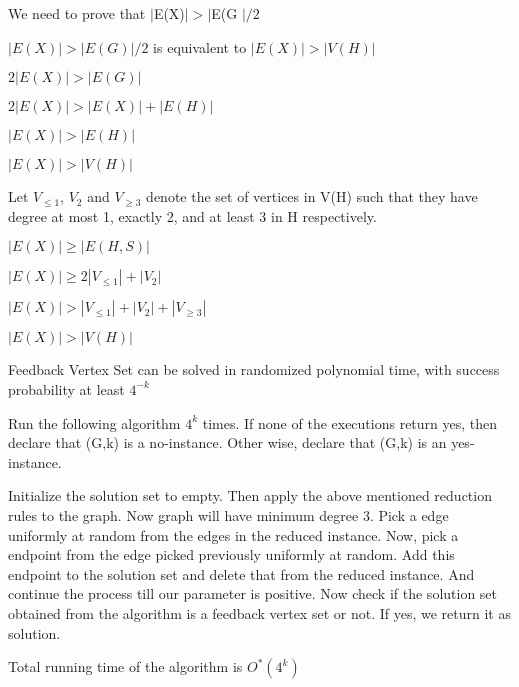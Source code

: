 \hspace*{2cm} We need to prove that $|$E(X)$| > |$E(G $|/2$

\hspace*{1.6cm} $|E(X)| >  |E(G)|/2$ is equivalent to $|E(X)| > |V(H)|$ 

\hspace*{2.6cm} $2|E(X)| > |E(G)| $ 

\hspace*{2.6cm} $2|E(X)| > |E(X)|+|E(H)| $ 

\hspace*{2.6cm} $|E(X)| > |E(H)| $ 

\hspace*{2.6cm} $|E(X)| > |V(H)|$ 

Let $V_{\leq 1}$, $V_2$ and $V_{\geq 3}$ denote the set of vertices in V(H) such that they
have degree at most 1, exactly 2, and at least 3 in H respectively. 

\hspace*{2cm} $|E(X)| \geq |E(H,S)|$ 

\hspace*{2cm} $|E(X)| \geq 2|V_{\leq 1}| + |V_2|$ 

\hspace*{2cm} $|E(X)| > |V_{\leq 1}| + |V_2| + |V_{\geq 3}|$ 

\hspace*{2cm} $|E(X)| > |V(H)|$ 

Feedback Vertex Set can be solved in randomized polynomial
time, with success probability at least $4^{-k}$

\vspace{0.3cm}
Run the following algorithm $4^k$ times. If none of the
executions return yes, then declare that (G,k) is a no-instance. Other wise, declare that
(G,k) is an yes-instance.

\hspace*{1.5cm} Initialize the solution set to empty. Then apply the above mentioned reduction rules to the graph.
Now graph will have minimum degree 3. Pick a edge uniformly at random from the edges in the reduced
instance. Now, pick a endpoint from the edge picked previously uniformly at random. Add this
endpoint to the solution set and delete that from the reduced instance. And continue the process till
our parameter is positive. Now check if the solution set obtained from the algorithm is a feedback
vertex set or not. If yes, we return it as solution.

\vspace{0.3cm}
Total running time of the algorithm is $O^*(4^{k})$

